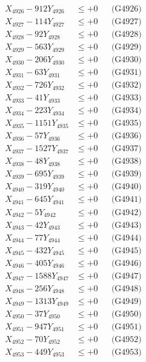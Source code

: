 \documentclass[a4paper,10pt]{article}
\begin{document}
{\begin{align}
X_{4926} - 912Y_{4926} &\leq +0 && \text{(G4926)} \\
X_{4927} - 114Y_{4927} &\leq +0 && \text{(G4927)} \\
X_{4928} - 92Y_{4928} &\leq +0 && \text{(G4928)} \\
X_{4929} - 563Y_{4929} &\leq +0 && \text{(G4929)} \\
X_{4930} - 206Y_{4930} &\leq +0 && \text{(G4930)} \\
\allowbreak
X_{4931} - 63Y_{4931} &\leq +0 && \text{(G4931)} \\
X_{4932} - 726Y_{4932} &\leq +0 && \text{(G4932)} \\
X_{4933} - 41Y_{4933} &\leq +0 && \text{(G4933)} \\
X_{4934} - 223Y_{4934} &\leq +0 && \text{(G4934)} \\
X_{4935} - 1151Y_{4935} &\leq +0 && \text{(G4935)} \\
X_{4936} - 57Y_{4936} &\leq +0 && \text{(G4936)} \\
X_{4937} - 1527Y_{4937} &\leq +0 && \text{(G4937)} \\
X_{4938} - 48Y_{4938} &\leq +0 && \text{(G4938)} \\
X_{4939} - 695Y_{4939} &\leq +0 && \text{(G4939)} \\
X_{4940} - 319Y_{4940} &\leq +0 && \text{(G4940)} \\
\allowbreak
X_{4941} - 645Y_{4941} &\leq +0 && \text{(G4941)} \\
X_{4942} - 5Y_{4942} &\leq +0 && \text{(G4942)} \\
X_{4943} - 42Y_{4943} &\leq +0 && \text{(G4943)} \\
X_{4944} - 77Y_{4944} &\leq +0 && \text{(G4944)} \\
X_{4945} - 432Y_{4945} &\leq +0 && \text{(G4945)} \\
X_{4946} - 405Y_{4946} &\leq +0 && \text{(G4946)} \\
X_{4947} - 1588Y_{4947} &\leq +0 && \text{(G4947)} \\
X_{4948} - 256Y_{4948} &\leq +0 && \text{(G4948)} \\
X_{4949} - 1313Y_{4949} &\leq +0 && \text{(G4949)} \\
X_{4950} - 37Y_{4950} &\leq +0 && \text{(G4950)} \\
\allowbreak
X_{4951} - 947Y_{4951} &\leq +0 && \text{(G4951)} \\
X_{4952} - 70Y_{4952} &\leq +0 && \text{(G4952)} \\
X_{4953} - 449Y_{4953} &\leq +0 && \text{(G4953)} \\

\end{align}}
\end{document}

